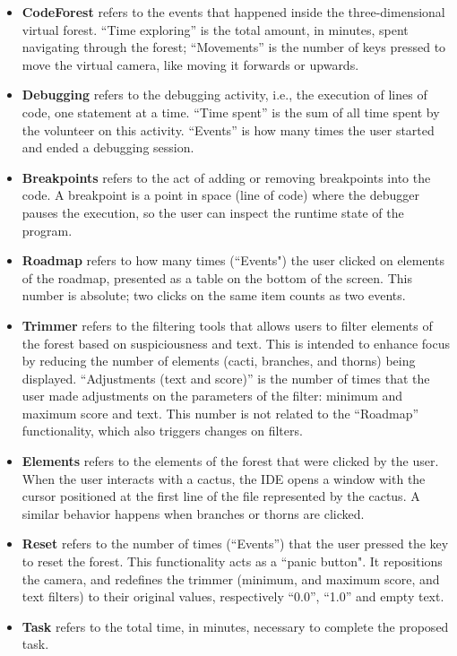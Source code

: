 \begin{itemize}
    \item \textbf{CodeForest} refers to the events that happened inside the
    three-dimensional virtual forest. ``Time exploring'' is the total amount, in
    minutes, spent navigating through the forest; ``Movements'' is the number of
    keys pressed to move the virtual camera, like moving it forwards or upwards.
    \item \textbf{Debugging} refers to the debugging activity, i.e., the
    execution of lines of code, one statement at a time. ``Time spent'' is the
    sum of all time spent by the volunteer on this activity. ``Events'' is
    how many times the user started and ended a debugging session.
    \item \textbf{Breakpoints} refers to the act of adding or removing
    breakpoints into the code. A breakpoint is a point in space (line of code)
    where the debugger pauses the execution, so the user can inspect the runtime
    state of the program.
    \item \textbf{Roadmap} refers to how many times (``Events") the user clicked
    on elements of the roadmap, presented as a table on the bottom of the
    screen.
    This number is absolute; two clicks on the same item counts as two events.
    \item \textbf{Trimmer} refers to the filtering tools that allows users to
    filter elements of the forest based on suspiciousness and text. This is
    intended to enhance focus by reducing the number of elements (cacti,
    branches, and thorns) being displayed. ``Adjustments (text and score)'' is
    the number of times that the user made adjustments on the parameters of the
    filter: minimum and maximum score and text. This number is not related to
    the ``Roadmap'' functionality, which also triggers changes on filters.
    \item \textbf{Elements} refers to the elements of the forest that were
    clicked by the user. When the user interacts with a cactus, the IDE opens a
    window with the cursor positioned at the first line of the file represented
    by the cactus. A similar behavior happens when branches or thorns are
    clicked.
    \item \textbf{Reset} refers to the number of times (``Events'') that the
    user pressed the key to reset the forest. This functionality acts as a
    ``panic button". It repositions the camera, and redefines the trimmer
    (minimum, and maximum score, and text filters) to their original values,
    respectively ``0.0'', ``1.0'' and empty text.
    \item \textbf{Task} refers to the total time, in minutes, necessary to
    complete the proposed task.
\end{itemize}

